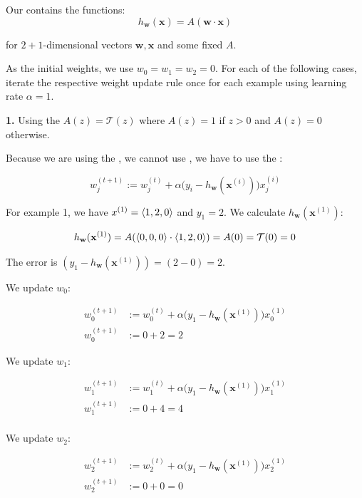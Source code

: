 Our  contains the functions:
\[
h_{\mathbf{w}}(\mathbf{x}) = A (\mathbf{w} \cdot \mathbf{x})
\]

for $2+1$-dimensional vectors $\mathbf{w}, \mathbf{x}$ and some fixed  $A$.

As the initial weights, we use $w_0 = w_1 = w_2 = 0$. For each of the following cases, iterate the respective weight update rule once for each example using learning rate $\alpha=1$.

\textbf{1. } Using the  $A(z) = \mathcal{T}(z)$ where $A(z) = 1$ if $z>0$ and $A(z) = 0$ otherwise. 

Because we are using the , we cannot use , we have to use the :

\[
w_j^{(t+1)} := w_j^{(t)} + \alpha \big(y_i - h_{\mathbf{w}}(\mathbf{x}^{(i)})\big) x_j^{(i)}
\]

For example 1, we have $x^{(1)} = \left\langle 1, 2, 0 \right\rangle$ and $y_1 = 2$. We calculate $h_{\mathbf{w}}(\mathbf{x}^{(1)})$:

\[
h_{\mathbf{w}}(\mathbf{x}^{(1)}) = A(\left\langle 0,0,0 \right\rangle \cdot \left\langle 1, 2, 0 \right\rangle) = A(0) = \mathcal{T}(0) = 0
\]

The error is $(y_1 - h_{\mathbf{w}}(\mathbf{x}^{(1)})) = (2 - 0) = 2$.

We update $w_0$:

\begin{align*}
w_0^{(t+1)} &:= w_0^{(t)} + \alpha \big(y_1 - h_{\mathbf{w}}(\mathbf{x}^{(1)})\big) x_0^{(1)} \\
w_0^{(t+1)} &:= 0 + 2 = 2
\end{align*}

We update $w_1$:

\begin{align*}
w_1^{(t+1)} &:= w_1^{(t)} + \alpha \big(y_1 - h_{\mathbf{w}}(\mathbf{x}^{(1)})\big) x_1^{(1)} \\
w_1^{(t+1)} &:= 0 + 4 = 4 \\
\end{align*}

We update $w_2$:

\begin{align*}
w_2^{(t+1)} &:= w_2^{(t)} + \alpha \big(y_1 - h_{\mathbf{w}}(\mathbf{x}^{(1)})\big) x_2^{(1)} \\
w_2^{(t+1)} &:= 0 + 0 = 0 \\
\end{align*}

